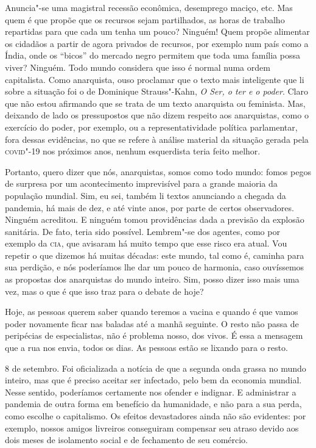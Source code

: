 Anuncia"-se uma magistral recessão econômica, desemprego maciço, etc. Mas
quem é que propõe que os recursos sejam partilhados, as horas de
trabalho repartidas para que cada um tenha um pouco? Ninguém! Quem
propõe alimentar os cidadãos a partir de agora privados de recursos, por
exemplo num país como a Índia, onde os ``bicos'' do mercado negro
permitem que toda uma família possa viver? Ninguém. Todo mundo considera
que isso é normal numa ordem capitalista. Como anarquista, ouso
proclamar que o texto mais inteligente que li sobre a situação foi o de
Dominique Strauss"-Kahn, \emph{O Ser, o ter e o poder}. Claro que não
estou afirmando que se trata de um texto anarquista ou feminista. Mas,
deixando de lado os pressupostos que não dizem respeito aos anarquistas,
como o exercício do poder, por exemplo, ou a representatividade política
parlamentar, fora dessas evidências, no que se refere à análise material
da situação gerada pela \textsc{covid}"-19 nos próximos anos, nenhum esquerdista
teria feito melhor.

Portanto, quero dizer que nós, anarquistas, somos como todo mundo: fomos
pegos de surpresa por um acontecimento imprevisível para a grande
maioria da população mundial. Sim, eu sei, também li textos anunciando a
chegada da pandemia, há mais de dez, e até vinte anos, por parte de
certos observadores. Ninguém acreditou. E ninguém tomou providências
dada a previsão da explosão sanitária. De fato, teria sido possível.
Lembrem"-se dos agentes, como por exemplo da \textsc{cia}, que avisaram há muito
tempo que esse risco era atual. Vou repetir o que dizemos há muitas
décadas: este mundo, tal como é, caminha para sua perdição, e nós
poderíamos lhe dar um pouco de harmonia, caso ouvíssemos as propostas
dos anarquistas do mundo inteiro. Sim, posso dizer isso mais uma vez,
mas o que é que isso traz para o debate de hoje?

Hoje, as pessoas querem saber
quando teremos a vacina e quando é que vamos poder novamente ficar nas
baladas até a manhã seguinte. O resto não passa de peripécias de
especialistas, não é problema nosso, dos vivos. É essa a mensagem que a
rua nos envia, todos os dias. As pessoas estão se lixando para o resto.

8 de setembro. Foi oficializada a notícia de que a segunda onda grassa
no mundo inteiro, mas que é preciso aceitar ser infectado, pelo bem da
economia mundial. Nesse sentido, poderíamos certamente nos ofender e
indignar. E administrar a pandemia de outra forma em benefício da
humanidade, e não para a sua perda, como escolhe o capitalismo. Os
efeitos devastadores ainda não são evidentes: por exemplo, nossos amigos
livreiros conseguiram compensar seu atraso devido aos dois meses de
isolamento social e de fechamento de seu comércio.

